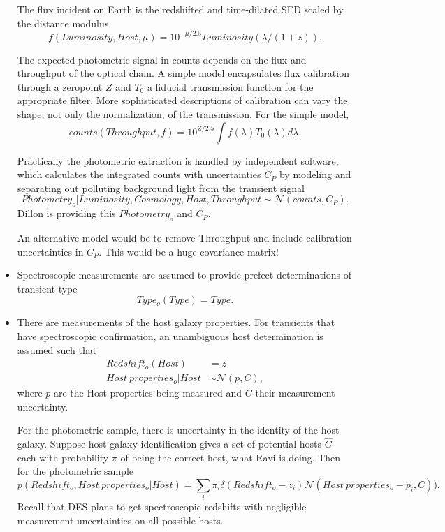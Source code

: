 \documentclass[preprint,3p]{elsarticle}
\begin{document}
\begin{itemize}
The flux incident on Earth is the redshifted and time-dilated SED scaled
by the distance modulus
\begin{equation}
f(Luminosity, Host, \mu) = 10^{-\mu/2.5} Luminosity(\lambda/(1+z)).
\end{equation}

The expected photometric signal in counts depends on the flux and throughput of the
optical chain.  A simple model encapsulates flux calibration through a zeropoint $Z$
and $T_0$  a fiducial transmission function for the appropriate filter.
More
sophisticated descriptions of calibration can vary the shape, not only the normalization, of the
transmission.  For the simple model,
\begin{equation}
counts(Throughput, f) = 10^{Z/2.5} \int  f(\lambda) T_0(\lambda)d\lambda.
\end{equation}

Practically the photometric extraction is handled by independent software, which calculates
the integrated counts with uncertainties $C_P$
by modeling and separating out polluting background light from the transient
signal
\begin{equation}
Photometry_o |  Luminosity, Cosmology,Host,Throughput \sim \mathcal{N}(counts,C_P).
\end{equation}
Dillon is providing this $Photometry_o$ and $C_P$.

An alternative model would be to remove Throughput
and include calibration uncertainties in $C_P$.  This would be a huge covariance
matrix!
\item Spectroscopic measurements are assumed
to provide prefect determinations of transient type
\begin{equation}
Type_o(Type)  = Type.
\end{equation}
\item There are measurements of the host galaxy properties.
For transients that have spectroscopic
confirmation, an unambiguous host determination is assumed such that
\begin{align}
Redshift_o(Host) & = z\\
Host~properties_o  | Host & \sim \mathcal{N}(p, C),
\end{align}
where $p$ are the Host properties being measured
and
$C$ their measurement uncertainty.

For the photometric sample, there is uncertainty in the identity of the host galaxy.
Suppose host-galaxy identification gives
a set of potential hosts $\hat{G}$ each with probability $\pi$ of being the correct host,
what Ravi is doing.
Then for the photometric sample
\begin{equation}
p(Redshift_o, Host~properties_o   | Host) = \sum_i \pi_i \delta(Redshift_o- z_i)\mathcal{N}(Host~properties_o-p_i, C)).
\end{equation}
Recall that DES plans to get spectroscopic redshifts with negligible measurement uncertainties on all
possible hosts.
\end{itemize}
\end{document}
